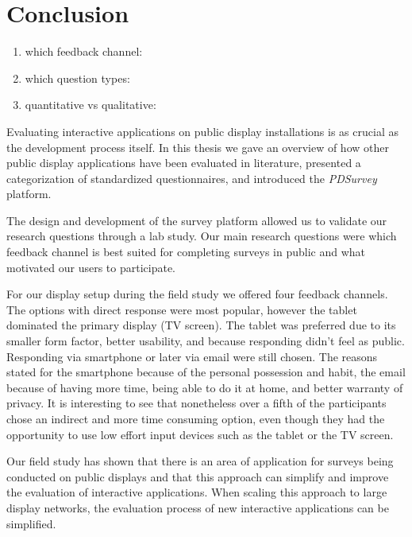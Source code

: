 \section{Conclusion}
\label{chapter:conclusion}


	\begin{enumerate}
	\item which feedback channel:
	\item which question types: 
	\item quantitative vs qualitative: 
	\end{enumerate}


	Evaluating interactive applications on public display installations is as crucial as the development process itself. In this thesis we gave an overview of how other public display applications have been evaluated in literature, presented a categorization of standardized questionnaires, and introduced the \textit{PDSurvey} platform. 

	The design and development of the survey platform allowed us to validate our research questions through a lab study. Our main research questions were which feedback channel is best suited for completing surveys in public and what motivated our users to participate. 

		For our display setup during the field study we offered four feedback channels. The options with direct response were most popular, however the tablet dominated the primary display (TV screen). The tablet was preferred due to its smaller form factor, better usability, and because responding didn't feel as public. Responding via smartphone or later via email were still chosen. The reasons stated for the smartphone because of the personal possession and habit, the email because of having more time, being able to do it at home, and better warranty of privacy. It is interesting to see that nonetheless over a fifth of the participants chose an indirect and more time consuming option, even though they had the opportunity to use low effort input devices such as the tablet or the TV screen.


	Our field study has shown that there is an area of application for surveys being conducted on public displays and that this approach can simplify and improve the evaluation of interactive applications. When scaling this approach to large display networks, the evaluation process of new interactive applications can be simplified.

